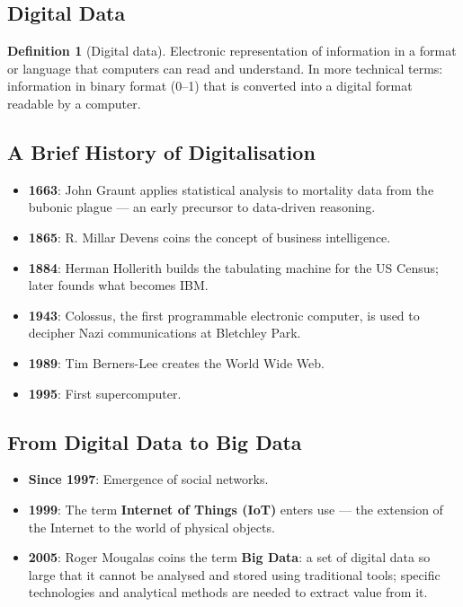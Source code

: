 \documentclass[11pt,a4paper,openany]{report}
\theoremstyle{definition}
\newtheorem{definition}{Definition}[chapter]
\theoremstyle{plain}
\theoremstyle{remark}
\begin{document}
\subsection{Digital Data}

\begin{definition}[Digital data]
Electronic representation of information in a format or language that computers can read and understand. In more technical terms: information in binary format (0--1) that is converted into a digital format readable by a computer.
\end{definition}

\subsection{A Brief History of Digitalisation}

\begin{itemize}
    \item \textbf{1663}: John Graunt applies statistical analysis to mortality data from the bubonic plague --- an early precursor to data-driven reasoning.
    \item \textbf{1865}: R. Millar Devens coins the concept of business intelligence.
    \item \textbf{1884}: Herman Hollerith builds the tabulating machine for the US Census; later founds what becomes IBM.
    \item \textbf{1943}: Colossus, the first programmable electronic computer, is used to decipher Nazi communications at Bletchley Park.
    \item \textbf{1989}: Tim Berners-Lee creates the World Wide Web.
    \item \textbf{1995}: First supercomputer.
\end{itemize}

\subsection{From Digital Data to Big Data}

\begin{itemize}
    \item \textbf{Since 1997}: Emergence of social networks.
    \item \textbf{1999}: The term \textbf{Internet of Things (IoT)} enters use --- the extension of the Internet to the world of physical objects.
    \item \textbf{2005}: Roger Mougalas coins the term \textbf{Big Data}: a set of digital data so large that it cannot be analysed and stored using traditional tools; specific technologies and analytical methods are needed to extract value from it.
\end{itemize}
\end{document}

